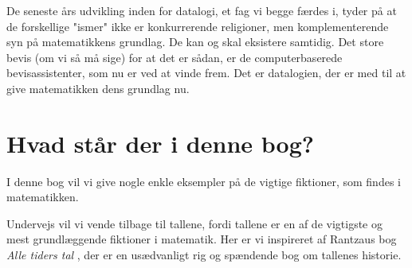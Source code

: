 De seneste års udvikling inden for datalogi, et fag vi begge færdes i, tyder på at de forskellige "ismer" ikke er konkurrerende religioner, men komplementerende syn på matematikkens grundlag. De kan og skal eksistere samtidig. Det store bevis (om vi så må sige) for at det er sådan, er de computerbaserede bevisassistenter, som nu er ved at vinde frem. Det er datalogien, der er med til at give matematikken dens grundlag nu.

\section{Hvad står der i denne bog?}

I denne bog vil vi give nogle enkle eksempler på de vigtige fiktioner, som findes i matematikken.

Undervejs vil vi vende tilbage til tallene, fordi tallene er en af de vigtigste og mest grundlæggende fiktioner i matematik. Her er vi inspireret af Rantzaus bog \emph{Alle tiders tal} \cite{rantzau}, der er en usædvanligt rig og spændende bog om tallenes historie.